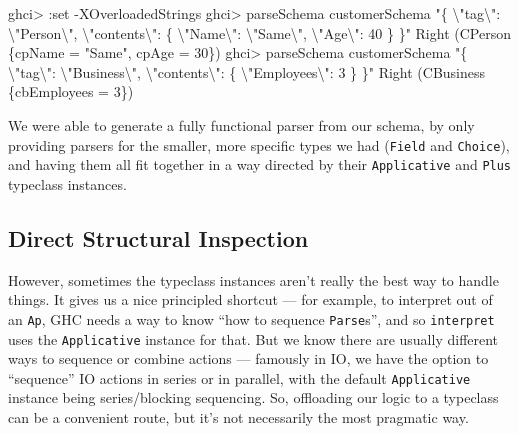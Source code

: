 \documentclass[]{article}
\newenvironment{Shaded}{}{}
\newcommand{\DataTypeTok}[1]{\textcolor[rgb]{0.56,0.13,0.00}{#1}}
\newcommand{\DecValTok}[1]{\textcolor[rgb]{0.25,0.63,0.44}{#1}}
\newcommand{\NormalTok}[1]{#1}
\newcommand{\OperatorTok}[1]{\textcolor[rgb]{0.40,0.40,0.40}{#1}}
\newcommand{\OtherTok}[1]{\textcolor[rgb]{0.00,0.44,0.13}{#1}}
\newcommand{\StringTok}[1]{\textcolor[rgb]{0.25,0.44,0.63}{#1}}
\begin{document}
\begin{Shaded}
\begin{Highlighting}[]
\NormalTok{ghci}\OperatorTok{>} \OperatorTok{:}\NormalTok{set }\OperatorTok{{-}}\DataTypeTok{XOverloadedStrings}
\NormalTok{ghci}\OperatorTok{>}\NormalTok{ parseSchema customerSchema  }\StringTok{"\{ \textbackslash{}"tag\textbackslash{}": \textbackslash{}"Person\textbackslash{}", \textbackslash{}"contents\textbackslash{}": \{ \textbackslash{}"Name\textbackslash{}": \textbackslash{}"Same\textbackslash{}", \textbackslash{}"Age\textbackslash{}": 40 \} \}"}
\DataTypeTok{Right}\NormalTok{ (}\DataTypeTok{CPerson}\NormalTok{ \{cpName }\OtherTok{=} \StringTok{"Same"}\NormalTok{, cpAge }\OtherTok{=} \DecValTok{30}\NormalTok{\})}
\NormalTok{ghci}\OperatorTok{>}\NormalTok{ parseSchema customerSchema  }\StringTok{"\{ \textbackslash{}"tag\textbackslash{}": \textbackslash{}"Business\textbackslash{}", \textbackslash{}"contents\textbackslash{}": \{ \textbackslash{}"Employees\textbackslash{}": 3 \} \}"}
\DataTypeTok{Right}\NormalTok{ (}\DataTypeTok{CBusiness}\NormalTok{ \{cbEmployees }\OtherTok{=} \DecValTok{3}\NormalTok{\})}
\end{Highlighting}
\end{Shaded}

We were able to generate a fully functional parser from our schema, by only
providing parsers for the smaller, more specific types we had (\texttt{Field}
and \texttt{Choice}), and having them all fit together in a way directed by
their \texttt{Applicative} and \texttt{Plus} typeclass instances.

\hypertarget{direct-structural-inspection}{%
\subsection{Direct Structural Inspection}\label{direct-structural-inspection}}

However, sometimes the typeclass instances aren't really the best way to handle
things. It gives us a nice principled shortcut --- for example, to interpret out
of an \texttt{Ap}, GHC needs a way to know ``how to sequence \texttt{Parse}s'',
and so \texttt{interpret} uses the \texttt{Applicative} instance for that. But
we know there are usually different ways to sequence or combine actions ---
famously in IO, we have the option to ``sequence'' IO actions in series or in
parallel, with the default \texttt{Applicative} instance being series/blocking
sequencing. So, offloading our logic to a typeclass can be a convenient route,
but it's not necessarily the most pragmatic way.
\end{document}
